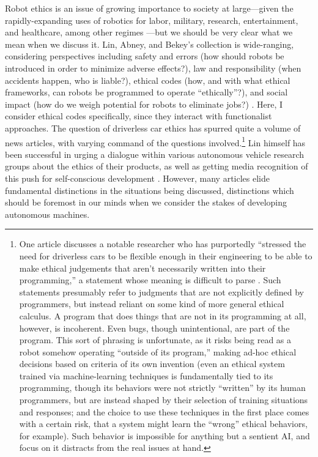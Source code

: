Robot ethics is an issue of growing importance to society at
large---given the rapidly-expanding uses of robotics for labor, military,
research, entertainment, and healthcare, among other regimes \cite[p. 5-6]{patrickLin}---but we should be very clear what we mean when we
discuss it. Lin, Abney, and Bekey's collection is wide-ranging,
considering perspectives including safety and errors (how should 
robots be introduced in order to minimize adverse effects?), law and
responsibility (when accidents happen, who is liable?), ethical codes
(how, and with what ethical frameworks, can robots be programmed to
operate ``ethically''?), and social impact
(how do we weigh potential for robots to eliminate
jobs?) \cite{robotEthics}. Here, I consider ethical codes specifically,
since they interact with functionalist approaches. The question of
driverless car ethics has spurred quite a volume of news articles,
with varying command of the questions
involved.\footnote{One article discusses a notable
  researcher who has purportedly ``stressed the need for driverless
  cars to be flexible enough in their 
engineering to be able to make ethical judgements that aren't
necessarily written into their programming,'' a statement whose
meaning is difficult to parse \cite{jessicaDavies}. Such statements
presumably 
refer to judgments that are not explicitly defined by programmers, but
instead reliant on some kind of more general ethical calculus. A
program that does things that are not in its programming at all,
however, is incoherent. Even bugs, though unintentional, are part of
the program. This sort of phrasing is unfortunate, as it
risks being read as a robot somehow operating ``outside of its
program,'' making ad-hoc ethical decisions based on criteria of its
own invention (even an ethical system trained via machine-learning
techniques is fundamentally tied to its programming, though its
behaviors were not strictly ``written'' by its human programmers, but
are instead shaped by their selection of training situations and
responses; and the choice to use these techniques in the first place
comes with a certain risk, that a system
might learn the ``wrong'' ethical behaviors, for example). Such
behavior is impossible for anything but a sentient
AI, and focus on it distracts from the real issues
at hand.} Lin himself has been successful in urging a dialogue
within various autonomous vehicle research groups about the ethics of
their products, as well as getting media recognition of this push for
self-conscious development \cite{timeEthics}. However, many articles
elide fundamental distinctions in the situations being discussed,
distinctions which should be foremost in our minds when we consider
the stakes of developing autonomous machines.

